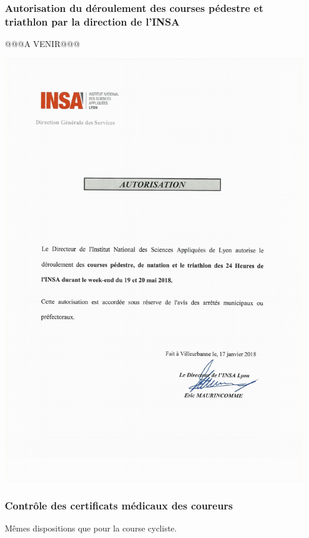 \documentclass[hidelinks, paper=a4, fontsize=13pt]{report}
\begin{document}
\subsubsection{Autorisation du déroulement des courses pédestre et triathlon par la direction de l’INSA}
@@@A VENIR@@@
\begin{center}
\includegraphics[scale=0.72]{Annexes/Documents/INSAAutorisationAutresCourses}
\end{center}

\subsubsection{Contrôle des certificats médicaux des coureurs}

Mêmes dispositions que pour la course cycliste.
\end{document}
